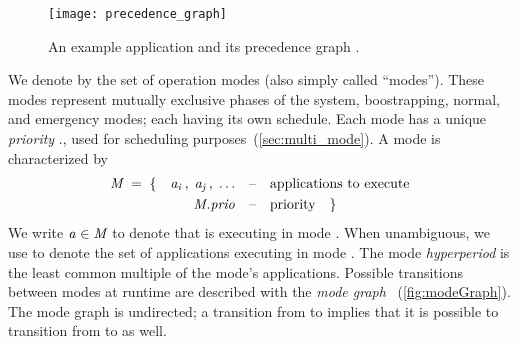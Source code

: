 \begin{figure}
\centering
\texttt{[image: precedence\_graph]}
\caption{An example application and its precedence graph \predG.
}
\label{fig:precedence_graph}
\end{figure}


We denote by \modeset the set of operation modes (also simply called ``modes'').
These modes represent mutually exclusive phases of the system, \eg boostrapping, normal, and emergency modes; each having its own schedule.
Each mode has a unique \emph{priority} \modeany.\prio, used for scheduling purposes~(\cref{sec:multi_mode}).
A mode \modeany is characterized by
\begin{align*}
\mathit{M_{}} \; = \; \{ \quad
	 \mathit{a_{i}}\, , \;
	 \mathit{a_{j}}\, , \; \ldots
	\quad &\text{--\quad applications to execute}\\
	 \mathit{M_{}}.\mathit{prio}
	\quad &\text{--\quad priority} \quad \}
\end{align*}
We write $\mathit{a_{}} \in \mathit{M_{}}$ to denote that \app is executing in mode \modeany.
When unambiguous, we use \modeany to denote the set of applications executing in mode \modeany.
The mode \emph{hyperperiod} \modeHyperperiod is the least common multiple of the mode's applications.
Possible transitions between modes at runtime are described with the \emph{mode graph} \modeGraph~(\cref{fig:modeGraph}). The mode graph is undirected; a transition from \modei to \modej implies that it is possible to transition from \modej to \modei as well.



